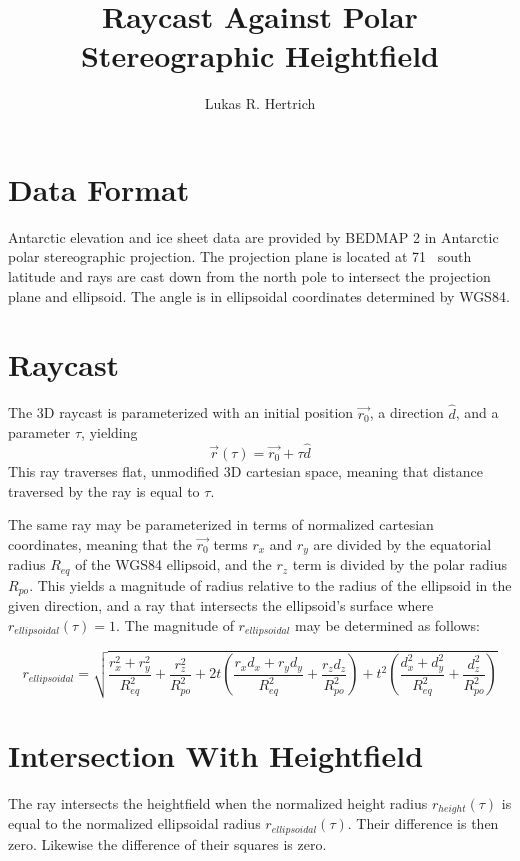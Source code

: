 \documentclass[a4paper,10pt]{article}
\title{Raycast Against Polar Stereographic Heightfield}
\author{Lukas R. Hertrich}
\begin{document}
\maketitle



\section{Data Format}
Antarctic elevation and ice sheet data are provided by BEDMAP 2 in Antarctic polar stereographic projection.
The projection plane is located at 71\textdegree~ south latitude and rays are cast down from the north pole to intersect the projection plane and ellipsoid.
The angle is in ellipsoidal coordinates determined by WGS84.
\section{Raycast}
The 3D raycast is parameterized with an initial position $\vec{r_0}$, a direction $\hat{d}$, and a parameter $\tau$, yielding
\begin{equation}\label{eqn:r_of_tau}
 \vec{r}(\tau) = \vec{r_0} + \tau \hat{d}
\end{equation}
This ray traverses flat, unmodified 3D cartesian space, meaning that distance traversed by the ray is equal to $\tau$.

The same ray may be parameterized in terms of normalized cartesian coordinates,
meaning that the $\vec{r_0}$ terms $r_x$ and $r_y$ are divided by the equatorial radius $R_{eq}$ of the WGS84 ellipsoid,
and the $r_z$ term is divided by the polar radius $R_{po}$.
This yields a magnitude of radius relative to the radius of the ellipsoid in the given direction, and a ray that intersects the ellipsoid's surface
where $r_{ellipsoidal}(\tau) = 1$.
The magnitude of $r_{ellipsoidal}$ may be determined as follows:

\begin{equation}\label{eqn:r_ellipsoidal}
 r_{ellipsoidal} = \sqrt{\frac{r_x^2 + r_y^2}{R_{eq}^2} + \frac{r_z^2}{R_{po}^2}
 + 2t\left(\frac{r_x d_x + r_y d_y}{R_{eq}^2} + \frac{r_z d_z	}{R_{po}^2}  \right)
 + t^2 \left( \frac{d_x^2 + d_y^2}{R_{eq}^2} + \frac{d_z^2}{R_{po}^2} \right)}
\end{equation}

\section{Intersection With Heightfield}
The ray intersects the heightfield when the normalized height radius $r_{height}(\tau)$ is equal to the normalized ellipsoidal radius $r_{ellipsoidal}(\tau)$.
Their difference is then zero. Likewise the difference of their squares is zero.
\end{document}

